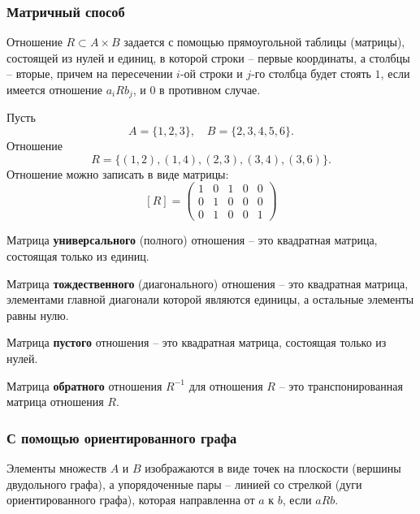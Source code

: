 \subsubsection{Матричный способ}

Отношение \(R \subset A \times B\) задается с помощью прямоугольной таблицы (матрицы), состоящей из нулей и единиц, в которой строки -- первые координаты, а столбцы -- вторые, причем на пересечении \(i\)-ой строки и \(j\)-го столбца будет стоять \(1\), если имеется отношение \(a_i R b_j\), и \(0\) в противном случае.

\begin{example*}
    Пусть
    \[
        A = \{1, 2, 3\},
        \quad
        B = \{2, 3, 4, 5, 6\}.
    \]
    Отношение
    \[
        R = \{(1, 2), (1, 4), (2, 3), (3, 4), (3, 6)\}.
    \]
    Отношение можно записать в виде матрицы:
    \[
        [R] =
        \begin{pmatrix}
            1 & 0 & 1 & 0 & 0 \\
            0 & 1 & 0 & 0 & 0 \\
            0 & 1 & 0 & 0 & 1
        \end{pmatrix}
    \]
\end{example*}

Матрица \textbf{универсального} (полного) отношения -- это квадратная матрица, состоящая только из единиц.

Матрица \textbf{тождественного} (диагонального) отношения -- это квадратная матрица, элементами главной диагонали которой являются единицы, а остальные элементы равны нулю.

Матрица \textbf{пустого} отношения -- это квадратная матрица, состоящая только из нулей.

Матрица \textbf{обратного} отношения \(R^{-1}\) для отношения \(R\) -- это транспонированная матрица отношения \(R\).

\subsubsection{С помощью ориентированного графа}

Элементы множеств \(A\) и \(B\) изображаются в виде точек на плоскости (вершины двудольного графа), а упорядоченные пары --  линией со стрелкой (дуги ориентированного графа), которая направленна от \(a\) к \(b\), если \(aRb\).

